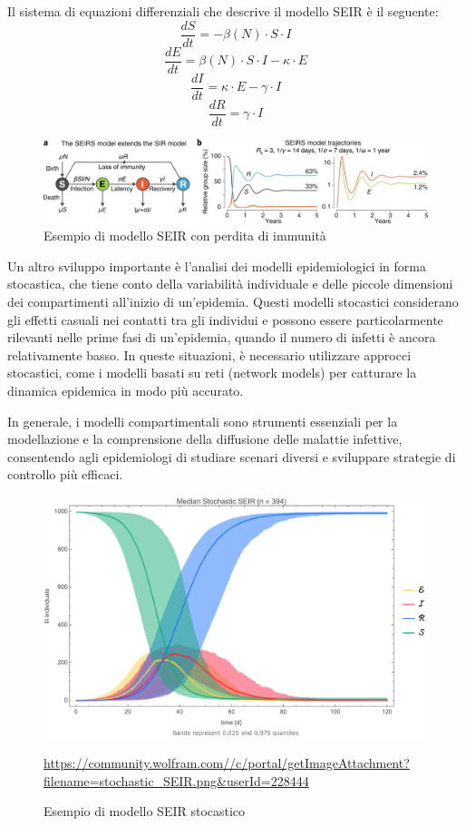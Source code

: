 Il sistema di equazioni differenziali che descrive il modello SEIR è il seguente:
\[ \frac{dS}{dt} = - \beta(N) \cdot S \cdot I \]
\[ \frac{dE}{dt} = \beta(N) \cdot S \cdot I - \kappa \cdot E \]
\[ \frac{dI}{dt} = \kappa \cdot E - \gamma \cdot I \]
\[ \frac{dR}{dt} = \gamma \cdot I \]

\begin{figure}[H]
    \begin{center}
        \includegraphics[width=\textwidth]{img/41592_2020_856_Fig1_HTML.png}
        \caption{Esempio di modello SEIR con perdita di immunità \cite{Bjornstad2020}}
        \label{fig:SEIRS_model}
    \end{center}
\end{figure}

Un altro sviluppo importante è l'analisi dei modelli epidemiologici in 
forma stocastica, che tiene conto della variabilità individuale e delle 
piccole dimensioni dei compartimenti all'inizio di un'epidemia. 
Questi modelli stocastici considerano gli effetti casuali nei contatti 
tra gli individui e possono essere particolarmente rilevanti nelle prime 
fasi di un'epidemia, quando il numero di infetti è ancora relativamente 
basso. In queste situazioni, è necessario utilizzare approcci stocastici, 
come i modelli basati su reti (network models) per catturare la dinamica 
epidemica in modo più accurato.

In generale, i modelli compartimentali sono strumenti essenziali per la 
modellazione e la comprensione della diffusione delle malattie infettive, 
consentendo agli epidemiologi di studiare scenari diversi e sviluppare 
strategie di controllo più efficaci.

\begin{figure}[H]
    \begin{center}
        \includegraphics[width=\textwidth]{img/stochastic_SEIR.png}
        \caption{Esempio di modello SEIR stocastico}
        \url{https://community.wolfram.com//c/portal/getImageAttachment?filename=stochastic_SEIR.png&userId=228444}
        \label{fig:stochastic_SEIR_model}
    \end{center}
\end{figure}